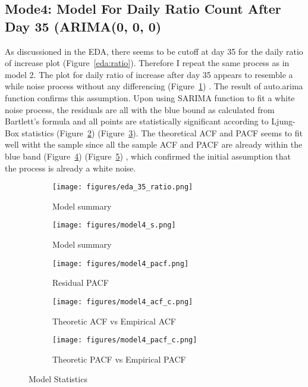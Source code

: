 \documentclass[a4paper]{article}
\begin{document}
\subsection{Mode4: Model For Daily Ratio Count After Day 35 (ARIMA(0, 0, 0)}
As discussioned in the EDA, there seems to be cutoff at day 35 for the daily ratio
of increase plot (Figure~\ref{eda:ratio}). Therefore I repeat the same process as
in model 2. The plot for daily ratio of increase after day 35 appears to resemble
a while noise process without any differencing (Figure~\ref{model4:eda}) . The
result of auto.arima function confirms this assumption. Upon using SARIMA function
to fit a white noise process, the residuals are all with the blue bound as
calculated from Bartlett's formula and all points are statistically significant
according to Ljung-Box statistics (Figure~\ref{model4:s}) (Figure~\ref{model4:p}).
The theoretical ACF and PACF seems to fit well witht the sample since all the
sample ACF and PACF are already within
the blue band (Figure~\ref{model4:ac}) (Figure~\ref{model4:pc}) , which confirmed
the initial assumption that the process is already a white noise.



\begin{figure}[htpb]
\centering

\begin{subfigure}{.5\textwidth}
  \centering
  \texttt{[image: figures/eda\_35\_ratio.png]}
  \caption{Model summary}
  \label{model4:eda}
\end{subfigure}

\begin{subfigure}{.5\textwidth}
  \centering
  \texttt{[image: figures/model4\_s.png]}
  \caption{Model summary}
  \label{model4:s}
\end{subfigure}%
\begin{subfigure}{.5\textwidth}
  \centering
  \texttt{[image: figures/model4\_pacf.png]}
  \caption{Residual PACF}
  \label{model4:p}
\end{subfigure}

\begin{subfigure}{.5\textwidth}
	\centering
	\texttt{[image: figures/model4\_acf\_c.png]}
	\caption{Theoretic ACF vs Empirical ACF}
	\label{model4:ac}
\end{subfigure}%
\begin{subfigure}{.5\textwidth}
	\centering
	\texttt{[image: figures/model4\_pacf\_c.png]}
	\caption{Theoretic PACF vs Empirical PACF}
	\label{model4:pc}
\end{subfigure}

\caption{Model Statistics}
\label{model4}
\end{figure}
\end{document}
